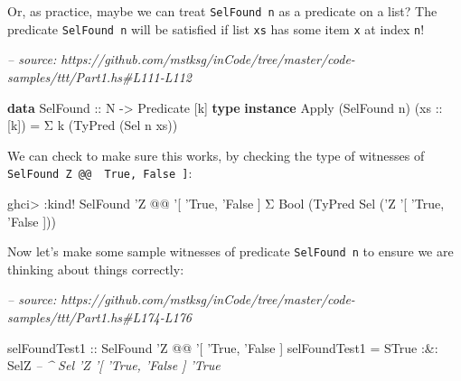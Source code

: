 \documentclass[]{article}
\newenvironment{Shaded}{}{}
\newcommand{\CommentTok}[1]{\textcolor[rgb]{0.38,0.63,0.69}{\textit{#1}}}
\newcommand{\DataTypeTok}[1]{\textcolor[rgb]{0.56,0.13,0.00}{#1}}
\newcommand{\FunctionTok}[1]{\textcolor[rgb]{0.02,0.16,0.49}{#1}}
\newcommand{\KeywordTok}[1]{\textcolor[rgb]{0.00,0.44,0.13}{\textbf{#1}}}
\newcommand{\NormalTok}[1]{#1}
\newcommand{\OtherTok}[1]{\textcolor[rgb]{0.00,0.44,0.13}{#1}}
\begin{document}
Or, as practice, maybe we can treat \texttt{SelFound\ n} as a predicate on a
list? The predicate \texttt{SelFound\ n} will be satisfied if list \texttt{xs}
has some item \texttt{x} at index \texttt{n}!

\begin{Shaded}
\begin{Highlighting}[]
\CommentTok{-- source: https://github.com/mstksg/inCode/tree/master/code-samples/ttt/Part1.hs#L111-L112}

\KeywordTok{data} \DataTypeTok{SelFound}\OtherTok{ ::} \DataTypeTok{N} \OtherTok{->} \DataTypeTok{Predicate}\NormalTok{ [k]}
\KeywordTok{type} \KeywordTok{instance} \DataTypeTok{Apply}\NormalTok{ (}\DataTypeTok{SelFound}\NormalTok{ n) (}\OtherTok{xs ::}\NormalTok{ [k]) }\FunctionTok{=}\NormalTok{ Σ k (}\DataTypeTok{TyPred}\NormalTok{ (}\DataTypeTok{Sel}\NormalTok{ n xs))}
\end{Highlighting}
\end{Shaded}

We can check to make sure this works, by checking the type of witnesses of
\texttt{SelFound\ \textquotesingle{}Z\ @@\ \textquotesingle{}{[}\ \textquotesingle{}True,\ \textquotesingle{}False\ {]}}:

\begin{Shaded}
\begin{Highlighting}[]
\NormalTok{ghci}\FunctionTok{>} \FunctionTok{:}\NormalTok{kind}\FunctionTok{!} \DataTypeTok{SelFound}\NormalTok{ '}\DataTypeTok{Z} \FunctionTok{@@}\NormalTok{ '[ '}\DataTypeTok{True}\NormalTok{, '}\DataTypeTok{False}\NormalTok{ ]}
\NormalTok{Σ }\DataTypeTok{Bool}\NormalTok{ (}\DataTypeTok{TyPred} \DataTypeTok{Sel}\NormalTok{ ('}\DataTypeTok{Z}\NormalTok{ '[ '}\DataTypeTok{True}\NormalTok{, '}\DataTypeTok{False}\NormalTok{ ]))}
\end{Highlighting}
\end{Shaded}

Now let's make some sample witnesses of predicate \texttt{SelFound\ n} to ensure
we are thinking about things correctly:

\begin{Shaded}
\begin{Highlighting}[]
\CommentTok{-- source: https://github.com/mstksg/inCode/tree/master/code-samples/ttt/Part1.hs#L174-L176}

\OtherTok{selFoundTest1 ::} \DataTypeTok{SelFound}\NormalTok{ '}\DataTypeTok{Z} \FunctionTok{@@}\NormalTok{ '[ '}\DataTypeTok{True}\NormalTok{, '}\DataTypeTok{False}\NormalTok{ ]}
\NormalTok{selFoundTest1 }\FunctionTok{=} \DataTypeTok{STrue} \FunctionTok{:&:} \DataTypeTok{SelZ}
                       \CommentTok{-- ^ Sel 'Z '[ 'True, 'False ] 'True}
\end{Highlighting}
\end{Shaded}
\end{document}
